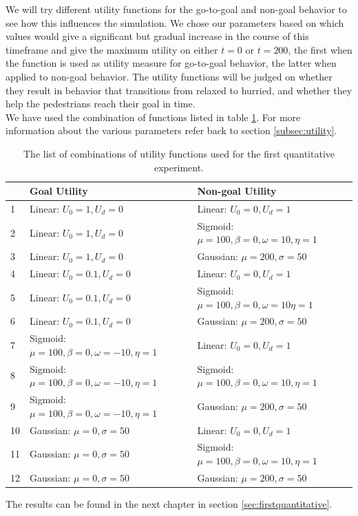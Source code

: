 \documentclass[11pt, a4paper]{book}
\begin{document}
We will try different utility functions for the go-to-goal and non-goal behavior to see how this influences the simulation. We chose our parameters based on which values would give a significant but gradual increase in the course of this timeframe and give the maximum utility on either $t=0$ or $t=200$, the first when the function is used as utility measure for go-to-goal behavior, the latter when applied to non-goal behavior. The utility functions will be judged on whether they result in behavior that transitions from relaxed to hurried, and whether they help the pedestrians reach their goal in time.\\
We have used the combination of functions listed in table \ref{tab:parameters}. For more information about the various parameters refer back to section \ref{subsec:utility}.
\begin{table}[h!]
\begin{tabular}{|l|l l|}
\hline
&\textbf{Goal Utility} & \textbf{Non-goal Utility}\\
\hline
1 & Linear: $U_0=1, U_d=0$ & Linear: $U_0=0, U_d=1$\\
\hline
2 & Linear: $U_0=1, U_d=0$ & Sigmoid: $\mu=100, \beta=0, \omega=10, \eta=1$\\
\hline
3 & Linear: $U_0=1, U_d=0$ & Gaussian: $\mu=200, \sigma=50$\\
\hline
4 & Linear: $U_0=0.1, U_d=0$ & Linear: $U_0=0, U_d=1$\\
\hline
5 & Linear: $U_0=0.1, U_d=0$ & Sigmoid: $\mu=100, \beta=0, \omega=10 \eta=1$\\
\hline
6 & Linear: $U_0=0.1, U_d=0$ & Gaussian: $\mu=200, \sigma=50$\\
\hline
7 & Sigmoid: $\mu=100, \beta=0, \omega=-10, \eta=1$ & Linear: $U_0=0, U_d=1$\\
\hline
8 & Sigmoid: $\mu=100, \beta=0, \omega=-10, \eta=1$ & Sigmoid: $\mu=100, \beta=0, \omega=10, \eta=1$\\
\hline
9 & Sigmoid: $\mu=100, \beta=0, \omega=-10, \eta=1$ & Gaussian: $\mu=200, \sigma=50$\\
\hline
10 & Gaussian: $\mu=0, \sigma=50$ & Linear: $U_0=0, U_d=1$\\
\hline
11 & Gaussian: $\mu=0, \sigma=50$ & Sigmoid: $\mu=100, \beta=0, \omega=10, \eta=1$\\
\hline
12 & Gaussian: $\mu=0, \sigma=50$ & Gaussian: $\mu=200, \sigma=50$\\
\hline
\end{tabular}
\caption{The list of combinations of utility functions used for the first quantitative experiment.}
\label{tab:parameters}
\end{table}
The results can be found in the next chapter in section \ref{sec:firstquantitative}.
\end{document}
